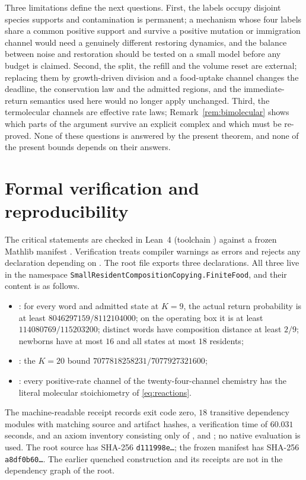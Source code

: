 \documentclass[11pt,a4paper]{article}
\theoremstyle{plain}
\theoremstyle{definition}
\theoremstyle{remark}
\begin{document}
Three limitations define the next questions. First, the labels occupy disjoint species supports and contamination is permanent; a mechanism whose four labels share a common positive support and survive a positive mutation or immigration channel would need a genuinely different restoring dynamics, and the balance between noise and restoration should be tested on a small model before any budget is claimed. Second, the split, the refill and the volume reset are external; replacing them by growth-driven division and a food-uptake channel changes the deadline, the conservation law and the admitted regions, and the immediate-return semantics used here would no longer apply unchanged. Third, the termolecular channels are effective rate laws; Remark~\ref{rem:bimolecular} shows which parts of the argument survive an explicit complex and which must be re-proved. None of these questions is answered by the present theorem, and none of the present bounds depends on their answers.

\appendix
\section{Formal verification and reproducibility}\label{app:verification}
The critical statements are checked in Lean~4 (toolchain ) against a frozen Mathlib manifest \citep{demoura2021,mathlib2020}. Verification treats compiler warnings as errors and rejects any declaration depending on . The root file  exports three declarations. All three live in the namespace \texttt{SmallResident\allowbreak Composition\allowbreak Copying.\allowbreak FiniteFood}, and their content is as follows.
\begin{itemize}
\item {}: for every word and admitted state at $K=9$, the actual return probability is at least $8046297159/8112104000$; on the operating box it is at least $114080769/115203200$; distinct words have composition distance at least $2/9$; newborns have at most $16$ and all states at most $18$ residents;
\item {}: the $K=20$ bound $7077818258231/7077927321600$;
\item {}: every positive-rate channel of the twenty-four-channel chemistry has the literal molecular stoichiometry of \eqref{eq:reactions}.
\end{itemize}
The machine-readable receipt records exit code zero, $18$ transitive dependency modules with matching source and artifact hashes, a verification time of $60.031$ seconds, and an axiom inventory consisting only of ,  and ; no native evaluation is used. The root source has SHA-256 \texttt{d111998e\ldots}; the frozen manifest has SHA-256 \texttt{a8df0b60\ldots}. The earlier quenched construction and its receipts are not in the dependency graph of the root.
\end{document}
